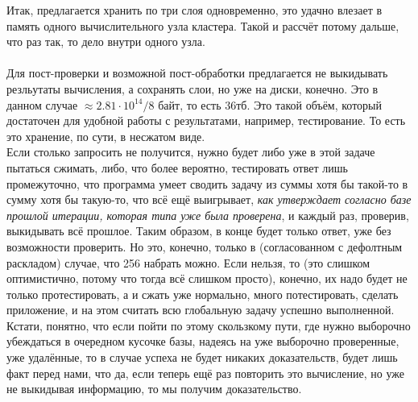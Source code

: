 \documentclass[12pt]{article}
\begin{document}
Итак, предлагается хранить по три слоя одновременно, это удачно влезает в память одного вычислительного узла кластера. Такой и рассчёт потому дальше, что раз так, то дело внутри одного узла.\\\\
Для пост-проверки и возможной пост-обработки предлагается не выкидывать резльутаты вычисления, а сохранять слои, но уже на диски, конечно. Это в данном случае $\approx 2.81 \cdot 10^{14} / 8$ байт, то есть 36тб. Это такой объём, который достаточен для удобной работы с результатами, например, тестирование. То есть это хранение, по сути, в несжатом виде.\\
Если столько запросить не получится, нужно будет либо уже в этой задаче пытаться сжимать, либо, что более вероятно, тестировать ответ лишь промежуточно, что программа умеет сводить задачу из суммы хотя бы такой-то в сумму хотя бы такую-то, что всё ещё выигрывает, \textit{как утверждает согласно базе прошлой итерации, которая типа уже была проверена}, и каждый раз, проверив, выкидывать всё прошлое. Таким образом, в конце будет только ответ, уже без возможности проверить. Но это, конечно, только в (согласованном с дефолтным раскладом) случае, что 256 набрать можно. Если нельзя, то (это слишком оптимистично, потому что тогда всё слишком просто), конечно, их надо будет не только протестировать, а и сжать уже нормально, много потестировать, сделать приложение, и на этом считать всю глобальную задачу успешно выполненной.\\
Кстати, понятно, что если пойти по этому скользкому пути, где нужно выборочно убеждаться в очередном кусочке базы, надеясь на уже выборочно проверенные, уже удалённые, то в случае успеха не будет никаких доказательств, будет лишь факт перед нами, что да, если теперь ещё раз повторить это вычисление, но уже не выкидывая информацию, то мы получим доказательство.\\
\clearpage
\end{document}
